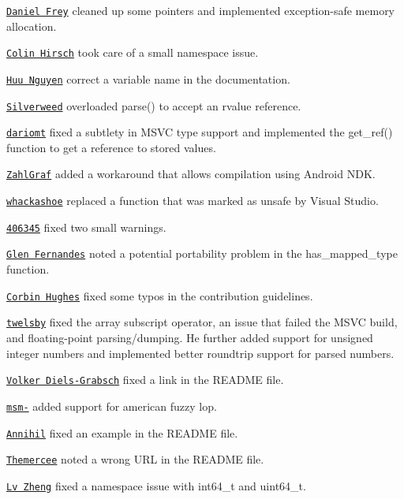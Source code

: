 \begin{DoxyItemize}
\item \href{https://github.com/d-frey}{\tt Daniel Frey} cleaned up some pointers and implemented exception-\/safe memory allocation.
\item \href{https://github.com/ColinH}{\tt Colin Hirsch} took care of a small namespace issue.
\item \href{https://github.com/whoshuu}{\tt Huu Nguyen} correct a variable name in the documentation.
\item \href{https://github.com/silverweed}{\tt Silverweed} overloaded {\ttfamily parse()} to accept an rvalue reference.
\item \href{https://github.com/dariomt}{\tt dariomt} fixed a subtlety in M\+S\+VC type support and implemented the {\ttfamily get\+\_\+ref()} function to get a reference to stored values.
\item \href{https://github.com/ZahlGraf}{\tt Zahl\+Graf} added a workaround that allows compilation using Android N\+DK.
\item \href{https://github.com/whackashoe}{\tt whackashoe} replaced a function that was marked as unsafe by Visual Studio.
\item \href{https://github.com/406345}{\tt 406345} fixed two small warnings.
\item \href{https://github.com/glenfe}{\tt Glen Fernandes} noted a potential portability problem in the {\ttfamily has\+\_\+mapped\+\_\+type} function.
\item \href{https://github.com/nibroc}{\tt Corbin Hughes} fixed some typos in the contribution guidelines.
\item \href{https://github.com/twelsby}{\tt twelsby} fixed the array subscript operator, an issue that failed the M\+S\+VC build, and floating-\/point parsing/dumping. He further added support for unsigned integer numbers and implemented better roundtrip support for parsed numbers.
\item \href{https://github.com/vog}{\tt Volker Diels-\/\+Grabsch} fixed a link in the R\+E\+A\+D\+ME file.
\item \href{https://github.com/msm-}{\tt msm-\/} added support for american fuzzy lop.
\item \href{https://github.com/Annihil}{\tt Annihil} fixed an example in the R\+E\+A\+D\+ME file.
\item \href{https://github.com/Themercee}{\tt Themercee} noted a wrong U\+RL in the R\+E\+A\+D\+ME file.
\item \href{https://github.com/lv-zheng}{\tt Lv Zheng} fixed a namespace issue with {\ttfamily int64\+\_\+t} and {\ttfamily uint64\+\_\+t}.

\end{DoxyItemize}
